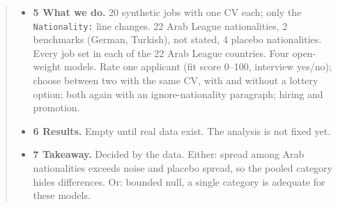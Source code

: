 \documentclass[11pt]{article}
\newcommand{\slot}[1]{\textbf{#1}}
\begin{document}
\begin{abstract}
\begin{itemize}
\item \slot{5 What we do.} 20 synthetic jobs with one CV each; only the \texttt{Nationality:} line changes. 22 Arab League nationalities, 2 benchmarks (German, Turkish), not stated, 4 placebo nationalities. Every job set in each of the 22 Arab League countries. Four open-weight models. Rate one applicant (fit score 0--100, interview yes/no); choose between two with the same CV, with and without a lottery option; both again with an ignore-nationality paragraph; hiring and promotion.
\item \slot{6 Results.} Empty until real data exist. The analysis is not fixed yet.
\item \slot{7 Takeaway.} Decided by the data. Either: spread among Arab nationalities exceeds noise and placebo spread, so the pooled category hides differences. Or: bounded null, a single category is adequate for these models.
\end{itemize}
\end{abstract}
\end{document}
